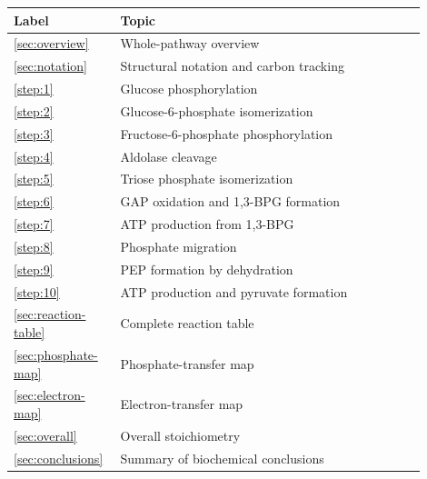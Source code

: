 \documentclass[11pt,a4paper]{article}
\begin{document}
\begin{longtable}{>{\raggedright\arraybackslash}p{0.20\linewidth}
                  >{\raggedright\arraybackslash}p{0.70\linewidth}}
\toprule
\textbf{Label} & \textbf{Topic}\\
\midrule
\ref{sec:overview} & Whole-pathway overview\\
\ref{sec:notation} & Structural notation and carbon tracking\\
\ref{step:1} & Glucose phosphorylation\\
\ref{step:2} & Glucose-6-phosphate isomerization\\
\ref{step:3} & Fructose-6-phosphate phosphorylation\\
\ref{step:4} & Aldolase cleavage\\
\ref{step:5} & Triose phosphate isomerization\\
\ref{step:6} & GAP oxidation and 1,3-BPG formation\\
\ref{step:7} & ATP production from 1,3-BPG\\
\ref{step:8} & Phosphate migration\\
\ref{step:9} & PEP formation by dehydration\\
\ref{step:10} & ATP production and pyruvate formation\\
\ref{sec:reaction-table} & Complete reaction table\\
\ref{sec:phosphate-map} & Phosphate-transfer map\\
\ref{sec:electron-map} & Electron-transfer map\\
\ref{sec:overall} & Overall stoichiometry\\
\ref{sec:conclusions} & Summary of biochemical conclusions\\
\bottomrule
\end{longtable}
\end{document}
